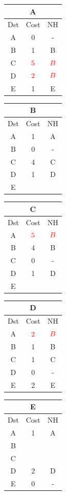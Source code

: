 \documentclass[10pt]{article}
\begin{document}
			\begin{table}[h!]
				\begin{tabular}{|c||c||c|}
					\hline
					\multicolumn{3}{|c|}{A} \\
					\hline
					Dst & Cost & NH \\
					\hline
					A & 0 & - \\
					B & 1 & B \\
					C & $\color{red} 5$ & $\color{red} B$ \\
					D & $\color{red} 2$ & $\color{red} B$ \\
					E & 1 & E \\
					\hline
				\end{tabular}
				\begin{tabular}{|c||c||c|}
					\hline
					\multicolumn{3}{|c|}{B} \\
					\hline
					Dst & Cost & NH \\
					\hline
					A & 1 & A \\
					B & 0 & - \\
					C & 4 & C \\
					D & 1 & D \\
					E &   &   \\
					\hline
				\end{tabular}
				\begin{tabular}{|c||c||c|}
					\hline
					\multicolumn{3}{|c|}{C} \\
					\hline
					Dst & Cost & NH \\
					\hline
					A & $\color{red} 5$ & $\color{red} B$ \\
					B & 4 & B \\
					C & 0 & - \\
					D & 1 & D \\
					E &   &   \\
					\hline
				\end{tabular}
				\begin{tabular}{|c||c||c|}
					\hline
					\multicolumn{3}{|c|}{D} \\
					\hline
					Dst & Cost & NH \\
					\hline
					A & $\color{red} 2$ & $\color{red} B$ \\
					B & 1 & B \\
					C & 1 & C \\
					D & 0 & - \\
					E & 2 & E \\
					\hline
				\end{tabular}
				\begin{tabular}{|c||c||c|}
					\hline
					\multicolumn{3}{|c|}{E} \\
					\hline
					Dst & Cost & NH \\
					\hline
					A & 1 & A \\
					B &   &   \\
					C &   &   \\
					D & 2 & D \\
					E & 0 & - \\
					\hline
				\end{tabular}
			\end{table}
\end{document}
